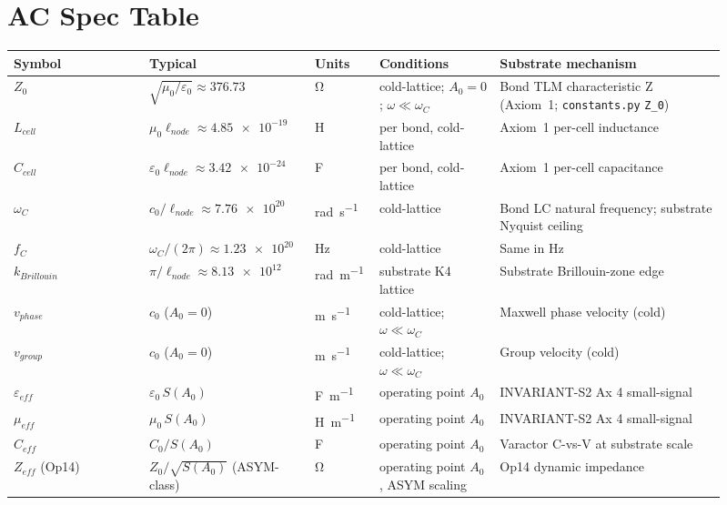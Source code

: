 \section{AC Spec Table}
\label{sec:vol9_ac_spec_table}

\begin{table}[htbp]
\centering
\begin{tabular}{p{0.18\linewidth} p{0.20\linewidth} p{0.07\linewidth} p{0.16\linewidth} p{0.30\linewidth}}
\toprule
\textbf{Symbol} & \textbf{Typical} & \textbf{Units} & \textbf{Conditions} & \textbf{Substrate mechanism} \\
\midrule
$Z_0$ & $\sqrt{\mu_0/\varepsilon_0} \approx \num{376.73}$ & \si{\ohm} & cold-lattice; $A_0 = 0$; $\omega \ll \omega_C$ & Bond TLM characteristic Z (Axiom~1; \texttt{constants.py} \texttt{Z\_0}) \\
$L_{cell}$ & $\mu_0 \ell_{node} \approx \num{4.85e-19}$ & \si{\henry} & per bond, cold-lattice & Axiom~1 per-cell inductance \\
$C_{cell}$ & $\varepsilon_0 \ell_{node} \approx \num{3.42e-24}$ & \si{\farad} & per bond, cold-lattice & Axiom~1 per-cell capacitance \\
$\omega_C$ & $c_0/\ell_{node} \approx \num{7.76e20}$ & \si{\radian\per\second} & cold-lattice & Bond LC natural frequency; substrate Nyquist ceiling \\
$f_C$ & $\omega_C/(2\pi) \approx \num{1.23e20}$ & \si{\hertz} & cold-lattice & Same in Hz \\
$k_{Brillouin}$ & $\pi/\ell_{node} \approx \num{8.13e12}$ & \si{\radian\per\metre} & substrate K4 lattice & Substrate Brillouin-zone edge \\
$v_{phase}$ & $c_0$ ($A_0 = 0$) & \si{\metre\per\second} & cold-lattice; $\omega \ll \omega_C$ & Maxwell phase velocity (cold) \\
$v_{group}$ & $c_0$ ($A_0 = 0$) & \si{\metre\per\second} & cold-lattice; $\omega \ll \omega_C$ & Group velocity (cold) \\
$\varepsilon_{eff}$ & $\varepsilon_0\, S(A_0)$ & \si{\farad\per\metre} & operating point $A_0$ & INVARIANT-S2 Ax 4 small-signal \\
$\mu_{eff}$ & $\mu_0\, S(A_0)$ & \si{\henry\per\metre} & operating point $A_0$ & INVARIANT-S2 Ax 4 small-signal \\
$C_{eff}$ & $C_0 / S(A_0)$ & \si{\farad} & operating point $A_0$ & Varactor C-vs-V at substrate scale \\
$Z_{eff}$ (Op14) & $Z_0/\sqrt{S(A_0)}$ (ASYM-class) & \si{\ohm} & operating point $A_0$, ASYM scaling & Op14 dynamic impedance \\

\end{tabular}
\end{table}
